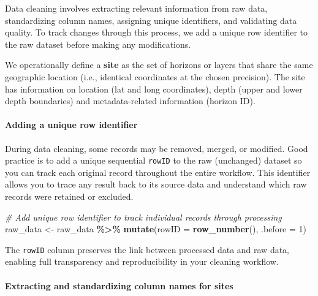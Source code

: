 \documentclass[
  10pt,
  b5paper,
  oneside]{book}
\newenvironment{Shaded}{\begin{snugshade}}{\end{snugshade}}
\newcommand{\AttributeTok}[1]{\textcolor[rgb]{0.13,0.29,0.53}{#1}}
\newcommand{\CommentTok}[1]{\textcolor[rgb]{0.56,0.35,0.01}{\textit{#1}}}
\newcommand{\DecValTok}[1]{\textcolor[rgb]{0.00,0.00,0.81}{#1}}
\newcommand{\FunctionTok}[1]{\textcolor[rgb]{0.13,0.29,0.53}{\textbf{#1}}}
\newcommand{\NormalTok}[1]{#1}
\newcommand{\OtherTok}[1]{\textcolor[rgb]{0.56,0.35,0.01}{#1}}
\newcommand{\SpecialCharTok}[1]{\textcolor[rgb]{0.81,0.36,0.00}{\textbf{#1}}}
\begin{document}
Data cleaning involves extracting relevant information from raw data, standardizing column names, assigning unique identifiers, and validating data quality. To track changes through this process, we add a unique row identifier to the raw dataset before making any modifications.

We operationally define a \textbf{site} as the set of horizons or layers that share the same geographic location (i.e., identical coordinates at the chosen precision). The site has information on location (lat and long coordinates), depth (upper and lower depth boundaries) and metadata-related information (horizon ID).

\paragraph*{Adding a unique row identifier}\label{adding-a-unique-row-identifier}

During data cleaning, some records may be removed, merged, or modified. Good practice is to add a unique sequential \texttt{rowID} to the raw (unchanged) dataset so you can track each original record throughout the entire workflow. This identifier allows you to trace any result back to its source data and understand which raw records were retained or excluded.

\begin{Shaded}
\begin{Highlighting}[]
\CommentTok{\# Add unique row identifier to track individual records through processing}
\NormalTok{raw\_data }\OtherTok{\textless{}{-}}\NormalTok{ raw\_data }\SpecialCharTok{\%\textgreater{}\%}
  \FunctionTok{mutate}\NormalTok{(}\AttributeTok{rowID =} \FunctionTok{row\_number}\NormalTok{(), }\AttributeTok{.before =} \DecValTok{1}\NormalTok{)}
\end{Highlighting}
\end{Shaded}

The \texttt{rowID} column preserves the link between processed data and raw data, enabling full transparency and reproducibility in your cleaning workflow.

\paragraph*{Extracting and standardizing column names for sites}\label{extracting-and-standardizing-column-names-for-sites}
\end{document}

